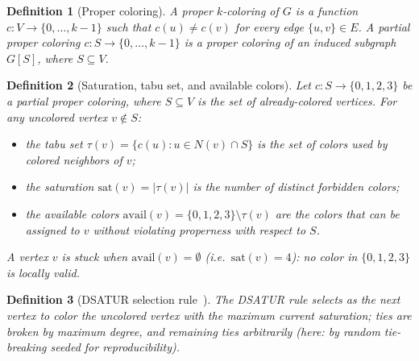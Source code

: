 \documentclass[11pt,twocolumn]{article}
\newtheorem{definition}{Definition}[section]
\begin{document}
\begin{definition}[Proper coloring]
A \emph{proper $k$-coloring} of $G$ is a function $c:V\to\{0,\dots,k-1\}$
such that $c(u)\ne c(v)$ for every edge $\{u,v\}\in E$.  A
\emph{partial proper coloring} $c:S\to\{0,\dots,k-1\}$ is a proper
coloring of an \emph{induced subgraph} $G[S]$, where $S\subseteq V$.
\end{definition}

\begin{definition}[Saturation, tabu set, and available colors]
\label{def:sat}
Let $c:S\to\{0,1,2,3\}$ be a partial proper coloring, where $S\subseteq V$
is the set of \emph{already-colored} vertices.  For any uncolored vertex
$v\notin S$:
\begin{itemize}[noitemsep]
  \item the \emph{tabu set} $\tau(v)=\{c(u):u\in N(v)\cap S\}$ is the set
        of colors used by colored neighbors of $v$;
  \item the \emph{saturation} $\mathrm{sat}(v)=|\tau(v)|$ is the number of
        distinct forbidden colors;
  \item the \emph{available colors} $\mathrm{avail}(v)=\{0,1,2,3\}\setminus\tau(v)$
        are the colors that can be assigned to $v$ without violating
        properness with respect to $S$.
\end{itemize}
A vertex $v$ is \emph{stuck} when $\mathrm{avail}(v)=\emptyset$
(i.e.\ $\mathrm{sat}(v)=4$): no color in $\{0,1,2,3\}$ is locally valid.
\end{definition}

\begin{definition}[DSATUR selection rule~\cite{brelaz1979}]
\label{def:dsatur}
The \emph{DSATUR rule} selects as the next vertex to color the uncolored
vertex with the \emph{maximum} current saturation; ties are broken by
maximum degree, and remaining ties arbitrarily (here: by random
tie-breaking seeded for reproducibility).
\end{definition}
\end{document}
